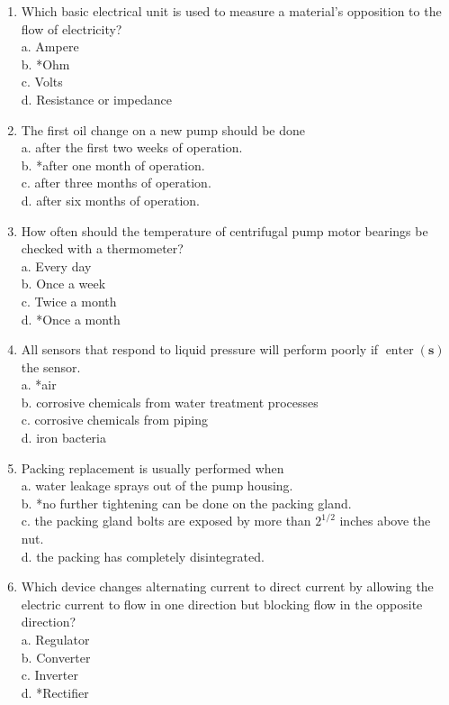 \documentclass[10pt]{article}
\begin{document}
\begin{enumerate}
  \item Which basic electrical unit is used to measure a material's opposition to the flow of electricity?\\
a. Ampere\\
b. *Ohm\\
c. Volts\\
d. Resistance or impedance

  \item The first oil change on a new pump should be done\\
a. after the first two weeks of operation.\\
b. *after one month of operation.\\
c. after three months of operation.\\
d. after six months of operation.

  \item How often should the temperature of centrifugal pump motor bearings be checked with a thermometer?\\
a. Every day\\
b. Once a week\\
c. Twice a month\\
d. *Once a month

  \item All sensors that respond to liquid pressure will perform poorly if $\operatorname{enter}(\mathbf{s})$ the sensor.\\
a. *air\\
b. corrosive chemicals from water treatment processes\\
c. corrosive chemicals from piping\\
d. iron bacteria

  \item Packing replacement is usually performed when\\
a. water leakage sprays out of the pump housing.\\
b. *no further tightening can be done on the packing gland.\\
c. the packing gland bolts are exposed by more than $2^{1 / 2}$ inches above the nut.\\
d. the packing has completely disintegrated. 

\item Which device changes alternating current to direct current by allowing the electric current to flow in one direction but blocking flow in the opposite direction?\\
a. Regulator\\
b. Converter\\
c. Inverter\\
d. *Rectifier


\end{enumerate}
\end{document}
